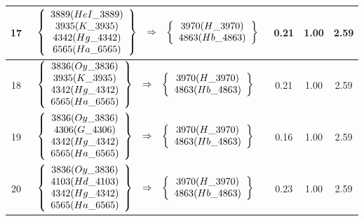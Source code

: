 \begin{longtable}{| c | l | c | c | c |}
17 & $\begin{array}{c c c}\left\{\begin{array}{c}3889 (HeI\_3889) \\ 3935 (K\_3935) \\ 4342 (Hg\_4342) \\ 6565 (Ha\_6565)\end{array}\right\} & \Rightarrow & \left\{\begin{array}{c}3970 (H\_3970) \\ 4863 (Hb\_4863)\end{array}\right\}\end{array}$ & 0.21 & 1.00 & 2.59 \\ \hline
18 & $\begin{array}{c c c}\left\{\begin{array}{c}3836 (Oy\_3836) \\ 3935 (K\_3935) \\ 4342 (Hg\_4342) \\ 6565 (Ha\_6565)\end{array}\right\} & \Rightarrow & \left\{\begin{array}{c}3970 (H\_3970) \\ 4863 (Hb\_4863)\end{array}\right\}\end{array}$ & 0.21 & 1.00 & 2.59 \\ \hline
19 & $\begin{array}{c c c}\left\{\begin{array}{c}3836 (Oy\_3836) \\ 4306 (G\_4306) \\ 4342 (Hg\_4342) \\ 6565 (Ha\_6565)\end{array}\right\} & \Rightarrow & \left\{\begin{array}{c}3970 (H\_3970) \\ 4863 (Hb\_4863)\end{array}\right\}\end{array}$ & 0.16 & 1.00 & 2.59 \\ \hline
20 & $\begin{array}{c c c}\left\{\begin{array}{c}3836 (Oy\_3836) \\ 4103 (Hd\_4103) \\ 4342 (Hg\_4342) \\ 6565 (Ha\_6565)\end{array}\right\} & \Rightarrow & \left\{\begin{array}{c}3970 (H\_3970) \\ 4863 (Hb\_4863)\end{array}\right\}\end{array}$ & 0.23 & 1.00 & 2.59 \\ \hline

\end{longtable}
